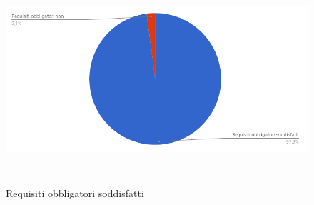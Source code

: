 \begin{figure}[hp]
\centering
\includegraphics[height=7cm]{img/RequisitiObbligatoriSoddisfatti.png}\\
\caption{Requisiti obbligatori soddisfatti}
\end{figure}

